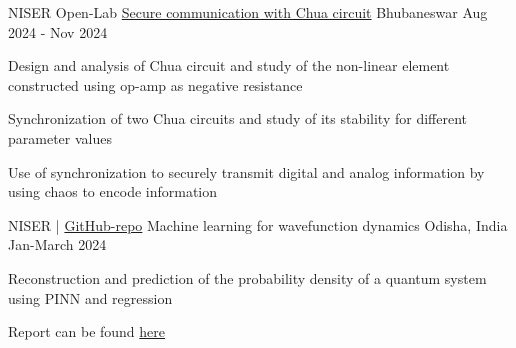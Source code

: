 

\begin{cventries}
	
\cventry
{NISER Open-Lab} %
{\href{}{Secure communication with Chua circuit}} %
{Bhubaneswar} %
{Aug 2024 - Nov 2024} %
{
	\begin{cvitems} %
		\item {Design and analysis of Chua circuit and study of the non-linear element constructed using op-amp as negative resistance}
		\item {Synchronization of two Chua circuits and study of its stability for different parameter values}
		\item {Use of synchronization to securely transmit digital and analog information by using chaos to encode information}\\
	\end{cvitems}
}

\cventry
{NISER | \href{https://github.com/smlab-niser/24cs460/tree/main/projects/Group1}{GitHub-repo}} %
{Machine learning for wavefunction dynamics} %
{Odisha, India} %
{Jan-March 2024} %
{
	\begin{cvitems} %
		\item{Reconstruction and prediction of the probability density of a quantum system using PINN and regression}
		\item{Report can be found \href{https://github.com/smlab-niser/24cs460/blob/main/projects/Group1/end-sem/final_report_cs460.pdf}{here}}\\
	\end{cvitems}
}



\end{cventries}
